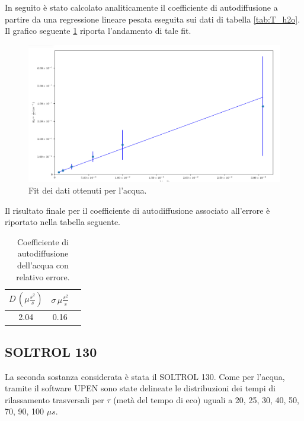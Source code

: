 In seguito è stato calcolato analiticamente il coefficiente di autodiffusione a partire da una regressione lineare pesata eseguita sui dati di tabella \ref{tab:T_h2o}.
Il grafico seguente \ref{fig:Df_h2o} riporta l'andamento di tale fit.

\begin{figure}[h!]
\centering
\includegraphics[scale=0.3]{Figure/H2O_calc.png}
\caption{Fit dei dati ottenuti per l'acqua.}
\label{fig:Df_h2o}
\end{figure}

Il risultato finale per il coefficiente di autodiffusione associato all'errore è riportato nella tabella seguente.

\begin{table}[h!]
    \begin{center}
    \begin{tabular}{c c c}
    \toprule
    	$D\,({\mu}\frac{s^2}{s})$ & $\sigma\,{\mu}\frac{s^2}{s}$ \\
    \midrule
    	2.04	&	0.16	\\
    \bottomrule
    \end{tabular}
    \caption{Coefficiente di autodiffusione dell'acqua con relativo errore.}
    \label{tab:Df_h2o}
    \end{center}
\end{table}


\subsection*{SOLTROL 130}

La seconda sostanza considerata è stata il SOLTROL 130.
Come per l'acqua, tramite il software UPEN sono state delineate le distribuzioni dei tempi di rilassamento trasversali per $\tau$ (metà del tempo di eco) uguali a 20, 25, 30, 40, 50, 70, 90, 100 ${\mu}s$.

